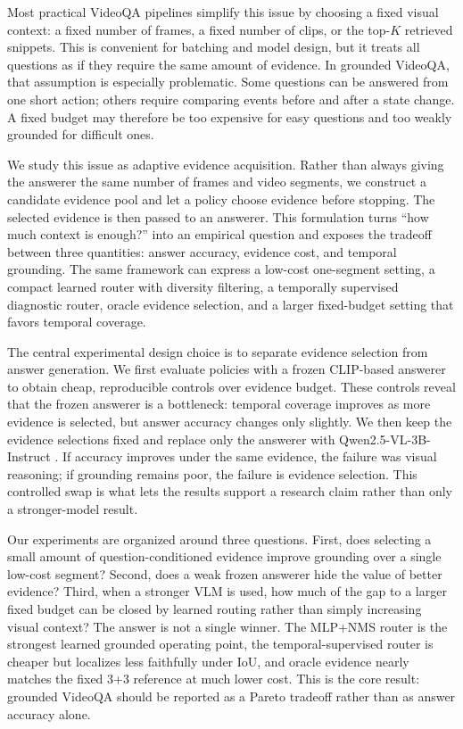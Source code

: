 \documentclass{article}
\begin{document}
Most practical VideoQA pipelines simplify this issue by choosing a fixed visual context: a fixed number of frames, a fixed number of clips, or the top-$K$ retrieved snippets. This is convenient for batching and model design, but it treats all questions as if they require the same amount of evidence. In grounded VideoQA, that assumption is especially problematic. Some questions can be answered from one short action; others require comparing events before and after a state change. A fixed budget may therefore be too expensive for easy questions and too weakly grounded for difficult ones.

We study this issue as adaptive evidence acquisition. Rather than always giving the answerer the same number of frames and video segments, we construct a candidate evidence pool and let a policy choose evidence before stopping. The selected evidence is then passed to an answerer. This formulation turns ``how much context is enough?'' into an empirical question and exposes the tradeoff between three quantities: answer accuracy, evidence cost, and temporal grounding. The same framework can express a low-cost one-segment setting, a compact learned router with diversity filtering, a temporally supervised diagnostic router, oracle evidence selection, and a larger fixed-budget setting that favors temporal coverage.

The central experimental design choice is to separate evidence selection from answer generation. We first evaluate policies with a frozen CLIP-based answerer to obtain cheap, reproducible controls over evidence budget. These controls reveal that the frozen answerer is a bottleneck: temporal coverage improves as more evidence is selected, but answer accuracy changes only slightly. We then keep the evidence selections fixed and replace only the answerer with Qwen2.5-VL-3B-Instruct \citep{qwen2025vl}. If accuracy improves under the same evidence, the failure was visual reasoning; if grounding remains poor, the failure is evidence selection. This controlled swap is what lets the results support a research claim rather than only a stronger-model result.

Our experiments are organized around three questions. First, does selecting a small amount of question-conditioned evidence improve grounding over a single low-cost segment? Second, does a weak frozen answerer hide the value of better evidence? Third, when a stronger VLM is used, how much of the gap to a larger fixed budget can be closed by learned routing rather than simply increasing visual context? The answer is not a single winner. The MLP+NMS router is the strongest learned grounded operating point, the temporal-supervised router is cheaper but localizes less faithfully under IoU, and oracle evidence nearly matches the fixed 3+3 reference at much lower cost. This is the core result: grounded VideoQA should be reported as a Pareto tradeoff rather than as answer accuracy alone.
\end{document}
